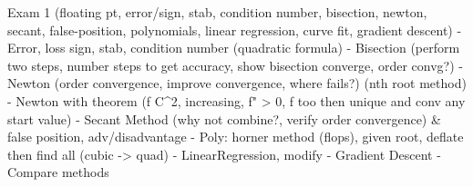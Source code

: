 \documentclass[12pt,letterpaper]{exam}
\begin{document}
\examtitle
{} 
\scores
\bottomline
\newpage


\begin{questions}

\newpage
\question[10] 


Exam 1 (floating pt, error/sign, stab, condition number, bisection, newton, secant, false-position, polynomials, linear regression, curve fit, gradient descent)
- Error, loss sign, stab, condition number (quadratic formula)
- Bisection (perform two steps, number steps to get accuracy, show bisection converge, order convg?)
- Newton (order convergence, improve convergence, where fails?) (nth root method)
- Newton with theorem (f \in C^2, increasing, f" > 0, f too then unique and conv any start value)
- Secant Method (why not combine?, verify order convergence) & false position, adv/disadvantage
- Poly: horner method (flops), given root, deflate then find all (cubic -> quad)
- LinearRegression, modify 
- Gradient Descent
- Compare methods





















\end{questions}
\end{document}
